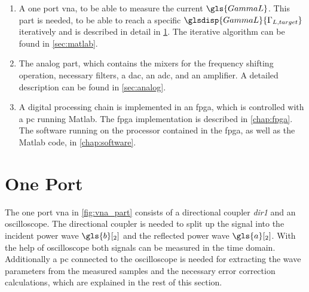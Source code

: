 \documentclass[12pt,a4paper,parskip=full,abstract=true,BCOR=12mm,twoside,open=right]{scrreprt}
\def\device#1{\mbox{\textit{#1}}}
\begin{document}
\begin{enumerate}
    \item A one port \gls{vna}, to be able to measure the current $\gls{GammaL}$. This part is
needed, to be able to reach a specific $\glsdisp{GammaL}{\Gamma_{L,target}}$ iteratively and is
described in detail in \cref{sec:vna}. The iterative algorithm can be found
in \cref{sec:matlab}.
    \item The analog part, which contains the mixers for the frequency shifting operation, necessary
        filters, a \gls{dac}, an \gls{adc}, and an amplifier. A detailed description can be found
        in \cref{sec:analog}.
    \item A digital processing chain is implemented in an \gls{fpga}, which is controlled with
a \gls{pc} running Matlab. The \gls{fpga} implementation is described in \cref{chap:fpga}.
The software running on the processor contained in the \gls{fpga}, as well as the Matlab
code, in \cref{chap:software}.
\end{enumerate}


\section{One Port }
\label{sec:vna}

The one port \gls{vna} in \cref{fig:vna_part} consists of a directional coupler
\device{dir1} and an oscilloscope. The directional coupler is needed to split up
the signal into the incident power wave $\gls{b}[_{2}]$ and the reflected power
wave $\gls{a}[_{2}]$. With the help of oscilloscope both signals can be measured in the
time domain. Additionally a \gls{pc} connected to the oscilloscope is needed
for extracting the wave parameters from the measured samples and the necessary
error correction calculations, which are explained in the rest of this section.
\end{document}
